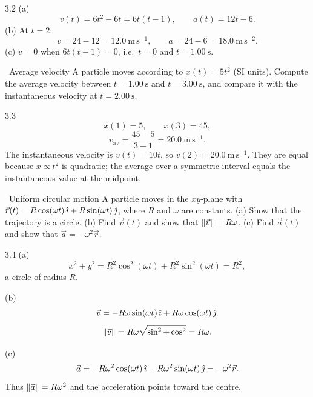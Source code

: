 \begin{solution}{3.2}
(a)
\[
v(t)=6t^2-6t=6t(t-1),\qquad a(t)=12t-6.
\]
(b) At $t=2$:
\[
v=24-12=12.0\ \mathrm{m\,s^{-1}},\qquad a=24-6=18.0\ \mathrm{m\,s^{-2}}.
\]
(c) $v=0$ when $6t(t-1)=0$, i.e.\ $t=0$ and $t=1.00\ \mathrm{s}$.
\end{solution}

\begin{exercise}{\warm\ Average velocity}
A particle moves according to $x(t)=5t^2$ (SI units). Compute the average
velocity between $t=1.00\ \mathrm{s}$ and $t=3.00\ \mathrm{s}$, and compare it
with the instantaneous velocity at $t=2.00\ \mathrm{s}$.
\end{exercise}

\begin{tabletworkspace}[6.5cm]
\end{tabletworkspace}

\begin{solution}{3.3}
\[
x(1)=5,\qquad x(3)=45,
\]
\[
v_{\mathrm{av}}=\frac{45-5}{3-1}=20.0\ \mathrm{m\,s^{-1}}.
\]
The instantaneous velocity is $v(t)=10t$, so
$v(2)=20.0\ \mathrm{m\,s^{-1}}$. They are equal because $x\propto t^2$ is
quadratic; the average over a symmetric interval equals the instantaneous value
at the midpoint.
\end{solution}

\begin{exercise}{\core\ Uniform circular motion}
A particle moves in the $xy$-plane with
$\vec r(t)=R\cos(\omega t)\,\hat{\imath}+R\sin(\omega t)\,\hat{\jmath}$, where $R$ and $\omega$
are constants.
(a) Show that the trajectory is a circle.
(b) Find $\vec v(t)$ and show that $\left\lVert \vec v \right\rVert=R\omega$.
(c) Find $\vec a(t)$ and show that $\vec a=-\omega^2\vec r$.
\end{exercise}

\begin{tabletworkspace}[6.5cm]
\end{tabletworkspace}

\begin{solution}{3.4}
(a)
\[
x^2+y^2=R^2\cos^2(\omega t)+R^2\sin^2(\omega t)=R^2,
\]
a circle of radius $R$.

(b)
\[
\vec v=-R\omega\sin(\omega t)\,\hat{\imath}+R\omega\cos(\omega t)\,\hat{\jmath}.
\]
\[
\left\lVert \vec v \right\rVert=R\omega\sqrt{\sin^2+\cos^2}=R\omega.
\]

(c)
\[
\vec a=-R\omega^2\cos(\omega t)\,\hat{\imath}-R\omega^2\sin(\omega t)\,\hat{\jmath}
=-\omega^2\vec r.
\]
Thus $\left\lVert \vec a \right\rVert=R\omega^2$ and the acceleration points toward the centre.
\end{solution}

